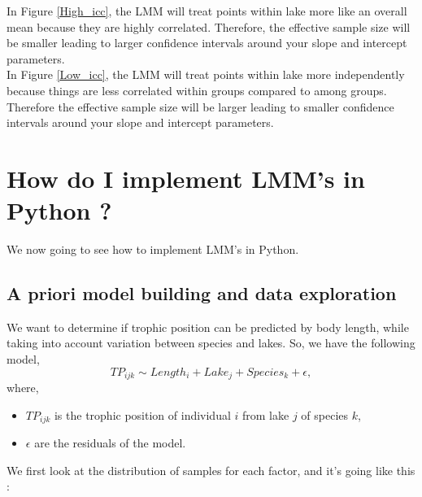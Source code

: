\documentclass{article}
\begin{document}
In Figure \ref{High_icc}, the LMM will treat points within lake more like an overall mean because they are highly correlated. Therefore, the effective sample size will be smaller leading to larger confidence intervals around your slope and intercept parameters.\\
In Figure \ref{Low_icc},  the LMM will treat points within lake more independently because things are less correlated within groups compared to among groups. Therefore the effective sample size will be larger leading to smaller confidence intervals around your slope and intercept parameters.

\section{How do I implement LMM’s in Python ?}
We now going to see how to implement LMM's in Python.

\subsection{A priori model building and data exploration}
We want to determine if trophic position can be predicted by body length, while taking into account variation between species and lakes. So, we have the following model,
\begin{equation*}
    TP_{ijk} \sim Length_i + Lake_j + Species_k + \epsilon ,
\end{equation*}
where,
\begin{itemize}
    \item $TP_{ijk}$ is the trophic position of individual $i$ from lake $j$ of species $k$,
    \item $\epsilon$ are the residuals of the model.
\end{itemize}

We first look at the distribution of samples for each factor, and it's going like this :
\end{document}
